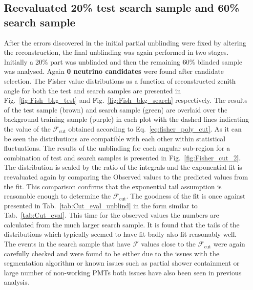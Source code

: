 \subsection{Reevaluated 20\% test search sample and 60\% search sample}
\label{subsec:unblind_60}
After the errors discovered in the initial partial unblinding were fixed by altering the reconstruction, the final unblinding was again performed in two stages. Initially a 20\% part was unblinded and then the remaining 60\% blinded sample was analysed. Again \textbf{0 neutrino candidates} were found after candidate selection. The Fisher value distributions as a function of reconstructed zenith angle for both the test and search samples are presented in Fig.~\ref{fig:Fish_bkg_test} and Fig.~\ref{fig:Fish_bkg_search} respectively. The results of the test sample (brown) and search sample (green) are overlaid over the background training sample (purple) in each plot with the dashed lines indicating the value of the $\mathcal{F}_{\text{cut}}$ obtained according to Eq.~\ref{eq:fisher_poly_cut}. As it can be seen the distributions are compatible with each other within statistical fluctuations. The results of the unblinding for each angular sub-region for a combination of test and search samples is presented in Fig.~\ref{fig:Fisher_cut_2}. The distribution is scaled by the ratio of the integrals and the exponential fit is reevaluated again by comparing the Observed values to the predicted values from the fit. This comparison confirms that the exponential tail assumption is reasonable enough to determine the $\mathcal{F}_{\text{cut}}$. The goodness of the fit is once against presented in Tab.~\ref{tab:Cut_eval_unblind} in the form similar to Tab.~\ref{tab:Cut_eval}. This time for the observed values the numbers are calculated from the much larger search sample. It is found that the tails of the distributions which typically seemed to have fit badly also fit reasonably well. The events in the search sample that have $\mathcal{F}$ values close to the $\mathcal{F}_{\text{cut}}$ were again carefully checked and were found to be either due to the issues with the segmentation algorithm or known issues such as partial shower containment or large number of non-working PMTs both issues have also been seen in previous analysis. 
\FloatBarrier

